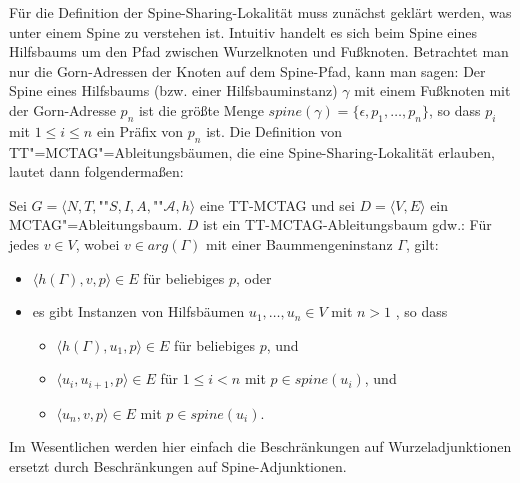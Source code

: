 Für die Definition der Spine-Sharing-Lokalität muss zunächst geklärt werden, was unter einem Spine zu verstehen ist. Intuitiv handelt es sich beim Spine eines Hilfsbaums um den Pfad zwischen Wurzelknoten und Fu\ss knoten. Betrachtet man nur die Gorn-Adressen der Knoten auf dem Spine-Pfad, kann man sagen: Der Spine eines Hilfsbaums (bzw. einer Hilfsbauminstanz) $\gamma$ mit einem Fu\ss knoten mit der Gorn-Adresse $p_n$ ist die größte Menge $spine(\gamma) = \{ \epsilon , p_1 , \ldots, p_n \}$, so dass $p_i$ mit $1 \leq i \leq n$ ein Präfix von $p_n$ ist. Die Definition von TT"=MCTAG"=Ableitungsbäumen, die eine Spine-Sharing-Lokalität erlauben, lautet dann folgenderma\ss en:
\begin{definition}
Sei $G = \langle N,T,$""$S,I,A,$""$\mathcal{A},h \rangle$ eine TT-MCTAG und sei $D = \langle V,E \rangle$ ein MCTAG"=Ableitungsbaum. $D$ ist ein TT-MCTAG-Ablei\-tungs\-baum gdw.:
Für jedes $v \in V$, wobei $v \in arg(\Gamma)$ mit einer Baummengeninstanz $\Gamma$, gilt:
\begin{itemize} 
  \item $\langle h(\Gamma),v,p \rangle \in E$ für beliebiges $p$, oder
  \item es gibt Instanzen von Hilfsbäumen $u_1, \ldots, u_n \in V$ mit $n>1$ , so dass
  \begin{itemize}
    \item $\langle h(\Gamma),u_1,p \rangle \in E$ für beliebiges $p$, und
    \item $\langle u_i,u_{i+1},p \rangle \in E$ für $1 \leq i < n$ mit $p \in spine(u_i)$, und
    \item $\langle u_n,v,p \rangle \in E$ mit $p \in spine(u_i)$.
  \end{itemize}
\end{itemize}  
\end{definition}
Im Wesentlichen werden hier einfach die Beschränkungen auf Wurzeladjunktionen ersetzt durch Beschränkungen auf Spine-Adjunktionen.

